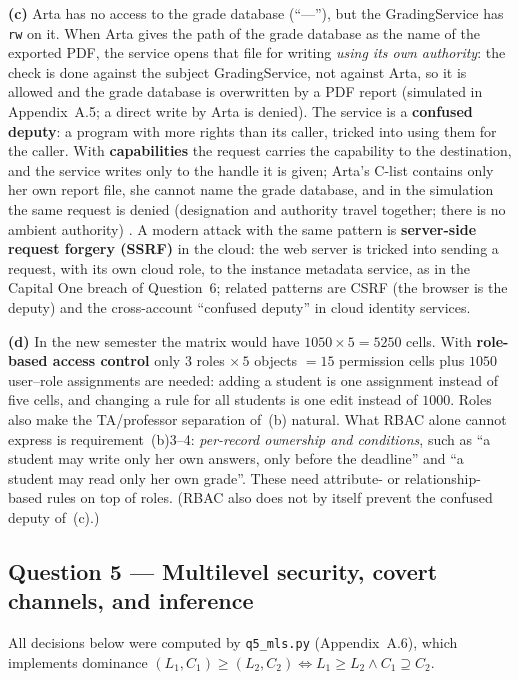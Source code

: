 \documentclass[11pt,a4paper]{article}
\begin{document}
\textbf{(c)} Arta has no access to the grade database (``---''), but the GradingService has \texttt{rw} on it.
When Arta gives the path of the grade database as the name of the exported PDF, the service opens that
file for writing \emph{using its own authority}: the check is done against the subject GradingService, not
against Arta, so it is allowed and the grade database is overwritten by a PDF report (simulated in
Appendix~A.5; a direct write by Arta is denied). The service is a \textbf{confused deputy}: a program with
more rights than its caller, tricked into using them for the caller. With \textbf{capabilities} the request
carries the capability to the destination, and the service writes only to the handle it is given; Arta's C-list
contains only her own report file, she cannot name the grade database, and in the simulation the same request is
denied (designation and authority travel together; there is no ambient authority) \cite{hardy}. A modern attack with
the same pattern is \textbf{server-side request forgery (SSRF)} in the cloud: the web server is tricked
into sending a request, with its own cloud role, to the instance metadata service, as in the Capital One
breach of Question~6; related patterns are CSRF (the browser is the deputy) and the cross-account ``confused
deputy'' in cloud identity services.

\textbf{(d)} In the new semester the matrix would have $1050\times5=5250$ cells. With \textbf{role-based access
control} \cite{ferraiolo} only $3$ roles $\times\,5$ objects $=15$ permission cells plus $1050$ user--role
assignments are needed: adding a student is one assignment instead of five cells, and changing a rule for all
students is one edit instead of $1000$. Roles also make the TA/professor separation of~(b) natural. What RBAC
alone cannot express is requirement~(b)3--4: \emph{per-record ownership and conditions}, such as ``a student may
write only her own answers, only before the deadline'' and ``a student may read only her own grade''. These need
attribute- or relationship-based rules on top of roles. (RBAC also does not by itself prevent the confused
deputy of~(c).)

\subsection*{Question 5 --- Multilevel security, covert channels, and inference}
All decisions below were computed by \texttt{q5\_mls.py} (Appendix~A.6), which implements dominance
$(L_1,C_1)\ge(L_2,C_2)\iff L_1\ge L_2\wedge C_1\supseteq C_2$.
\end{document}
